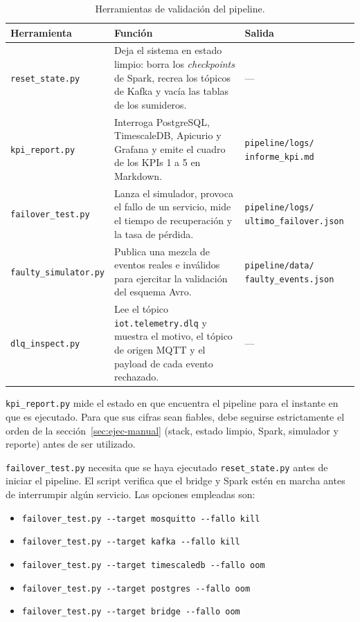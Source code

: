 \begin{table}[H]
  \centering
  \begin{tabular}{|p{3.8cm}|p{7.3cm}|p{4cm}|}
    \hline
    \textbf{Herramienta} & \textbf{Función} & \textbf{Salida} \\ \hline
    \texttt{reset\_state.py} & Deja el sistema en estado limpio: borra los \textit{checkpoints} de Spark, recrea los tópicos de Kafka y vacía las tablas de los sumideros. & --- \\ \hline
    \texttt{kpi\_report.py} & Interroga PostgreSQL, TimescaleDB, Apicurio y Grafana y emite el cuadro de los KPIs 1 a 5 en Markdown. & \texttt{pipeline/logs/} \texttt{informe\_kpi.md} \\ \hline
    \texttt{failover\_test.py} & Lanza el simulador, provoca el fallo de un servicio, mide el tiempo de recuperación y la tasa de pérdida. & \texttt{pipeline/logs/} \texttt{ultimo\_failover.json} \\ \hline
    \texttt{faulty\_simulator.py} & Publica una mezcla de eventos reales e inválidos para ejercitar la validación del esquema Avro. & \texttt{pipeline/data/} \texttt{faulty\_events.json} \\ \hline
    \texttt{dlq\_inspect.py} & Lee el tópico \texttt{iot.telemetry.dlq} y muestra el motivo, el tópico de origen MQTT y el payload de cada evento rechazado. & --- \\ \hline
  \end{tabular}
  \caption{Herramientas de validación del pipeline.}
  \label{tab:herramientas-validacion}
\end{table}

\texttt{kpi\_report.py} mide el estado en que encuentra el pipeline para el instante en que es ejecutado. Para que sus cifras sean fiables, debe seguirse estrictamente el orden de la sección~\ref{sec:ejec-manual} (stack, estado limpio, Spark, simulador y reporte) antes de ser utilizado.

\texttt{failover\_test.py} necesita que se haya ejecutado \texttt{reset\_state.py} antes de iniciar el pipeline. El script verifica que el bridge y Spark estén en marcha antes de interrumpir algún servicio. Las opciones empleadas son:

\begin{itemize}
  \item \texttt{failover\_test.py -{}-target mosquitto -{}-fallo kill}
  \item \texttt{failover\_test.py -{}-target kafka -{}-fallo kill}
  \item \texttt{failover\_test.py -{}-target timescaledb -{}-fallo oom}
  \item \texttt{failover\_test.py -{}-target postgres -{}-fallo oom}
  \item \texttt{failover\_test.py -{}-target bridge -{}-fallo oom}
\end{itemize}


